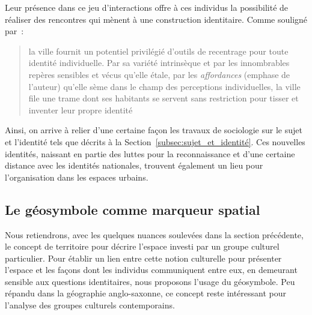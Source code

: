Leur présence dans ce jeu d'interactions offre à ces individus la possibilité de réaliser des rencontres qui mènent à une construction identitaire.
Comme souligné par~\citeauthor{DiMeo2007}: \blockquote[{\cite[81]{DiMeo2007}}][.]{\textelp{} la ville fournit un potentiel privilégié d’outils de recentrage pour toute identité individuelle. Par sa variété intrinsèque et par les innombrables repères sensibles et vécus qu’elle étale, par les \emph{affordances} (emphase de l'auteur) qu’elle sème dans le champ des perceptions individuelles, la ville file une trame dont ses habitants se servent sans restriction pour tisser et inventer leur propre identité}.

Ainsi, on arrive à relier d'une certaine façon les travaux de sociologie sur le sujet et l'identité tels que décrits à la Section~\ref{subsec:sujet_et_identité}.
Ces nouvelles identités, naissant en partie des luttes pour la reconnaissance et d'une certaine distance avec les identités nationales, trouvent également un lieu pour l'organisation dans les espaces urbains.





\subsection{Le géosymbole comme marqueur spatial}
\label{sec:le_symbole_comme_marqueur_spatial} Nous retiendrons, avec les quelques nuances soulevées dans la section précédente, le concept de territoire pour décrire l'espace investi par un groupe culturel particulier.
Pour établir un lien entre cette notion culturelle pour présenter l'espace et les façons dont les individus communiquent entre eux, en demeurant sensible aux questions identitaires, nous proposons l'usage du géosymbole.
Peu répandu dans la géographie anglo-saxonne, ce concept reste intéressant pour l'analyse des groupes culturels contemporains.

